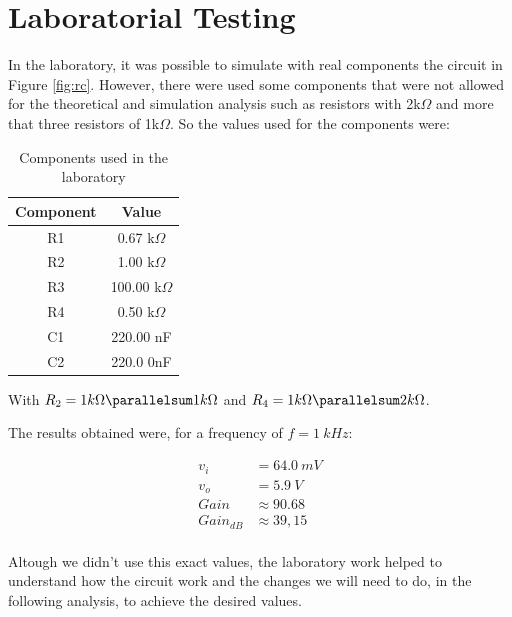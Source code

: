 \section{Laboratorial Testing} \label{sec:Lab}

In the laboratory, it was possible to simulate with real components the circuit in Figure \ref{fig:rc}. However, there were used some components that were not allowed for the theoretical and simulation analysis such as resistors with 2k$\Omega$ and more that three resistors of 1k$\Omega$. So the values used for the components were:
\begin{table}[!htb]
\centering
  \begin{tabular}{|c | c|}
    \hline    
\bf Component  & \bf Value\\ \hline 
R1  & 0.67 k$\Omega$ \\ \hline 
R2  & 1.00 k$\Omega$ \\ \hline 
R3  & 100.00 k$\Omega$ \\ \hline 
R4  & 0.50 k$\Omega$ \\ \hline 
C1  & 220.00 nF \\ \hline 
C2  & 220.0 0nF \\ \hline 

\end{tabular}
 \caption{Components used in the laboratory}\label{tab:labb}
\end{table}

With $R_2= 1k\Omega \parallelsum 1k\Omega$ and $R_4= 1k\Omega \parallelsum 2k\Omega$.

The results obtained were, for a frequency of $f = 1\ kHz$: 

\begin{align*}
  v_i &= 64.0\ mV \\
  v_o &= 5.9\ V \\
  Gain &\approx 90.68 \\
  Gain_{dB} &\approx 39,15 \\
\end{align*}

Altough we didn't use this exact values, the laboratory work helped to understand how the circuit work and the changes we will need to do, in the following analysis, to achieve the desired values.

